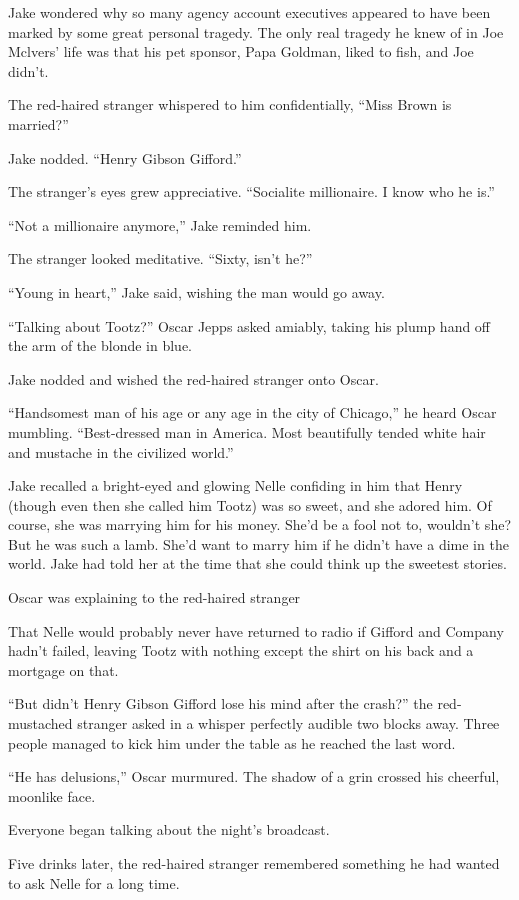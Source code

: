 \documentclass{novel}
\begin{document}
Jake wondered why so many agency account executives appeared to have been marked by some great personal tragedy. The only real tragedy he knew of in Joe Mclvers’ life was that his pet sponsor, Papa Goldman, liked to fish, and Joe didn’t.

The red-haired stranger whispered to him confidentially, “Miss Brown is married?”

Jake nodded. “Henry Gibson Gifford.”

The stranger’s eyes grew appreciative. “Socialite millionaire. I know who he is.”

“Not a millionaire anymore,” Jake reminded him.

The stranger looked meditative. “Sixty, isn’t he?”

“Young in heart,” Jake said, wishing the man would go away.

“Talking about Tootz?” Oscar Jepps asked amiably, taking his plump hand off the arm of the blonde in blue.

Jake nodded and wished the red-haired stranger onto Oscar.

“Handsomest man of his age or any age in the city of Chicago,” he heard Oscar mumbling. “Best-dressed man in America. Most beautifully tended white hair and mustache in the civilized world.”

Jake recalled a bright-eyed and glowing Nelle confiding in him that Henry (though even then she called him Tootz) was so sweet, and she adored him. Of course, she was marrying him for his money. She’d be a fool not to, wouldn’t she? But he was such a lamb. She’d want to marry him if he didn’t have a dime in the world. Jake had told her at the time that she could think up the sweetest stories.

Oscar was explaining to the red-haired stranger

That Nelle would probably never have returned to radio if Gifford and Company hadn’t failed, leaving Tootz with nothing except the shirt on his back and a mortgage on that.

“But didn’t Henry Gibson Gifford lose his mind after the crash?” the red-mustached stranger asked in a whisper perfectly audible two blocks away. Three people managed to kick him under the table as he reached the last word.

“He has delusions,” Oscar murmured. The shadow of a grin crossed his cheerful, moonlike face.

Everyone began talking about the night’s broadcast.

Five drinks later, the red-haired stranger remembered something he had wanted to ask Nelle for a long time.
\end{document}
